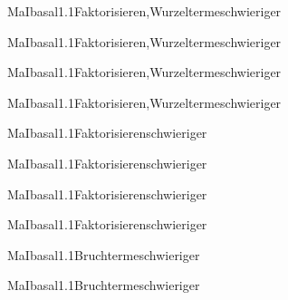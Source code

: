 \documentclass[12pt]{article}
\begin{document}
    \begin{Add}{MaI}{basal1.1}{Faktorisieren,Wurzelterme}{schwieriger}
    \solution{ }
    \end{Add}
    \begin{Add}{MaI}{basal1.1}{Faktorisieren,Wurzelterme}{schwieriger}
    \end{Add}
    

    \begin{Add}{MaI}{basal1.1}{Faktorisieren,Wurzelterme}{schwieriger}
    \solution{ }
    \end{Add}
    \begin{Add}{MaI}{basal1.1}{Faktorisieren,Wurzelterme}{schwieriger}
    \end{Add}
    

    \begin{Add}{MaI}{basal1.1}{Faktorisieren}{schwieriger}
    \solution{ }
    \end{Add}
    \begin{Add}{MaI}{basal1.1}{Faktorisieren}{schwieriger}
    \end{Add}
    

    \begin{Add}{MaI}{basal1.1}{Faktorisieren}{schwieriger}
    \solution{ }
    \end{Add}
    \begin{Add}{MaI}{basal1.1}{Faktorisieren}{schwieriger}
    \end{Add}
    

    \begin{Add}{MaI}{basal1.1}{Bruchterme}{schwieriger}
    \solution{ }
    \end{Add}
    \begin{Add}{MaI}{basal1.1}{Bruchterme}{schwieriger}
    \end{Add}
    
\end{document}
